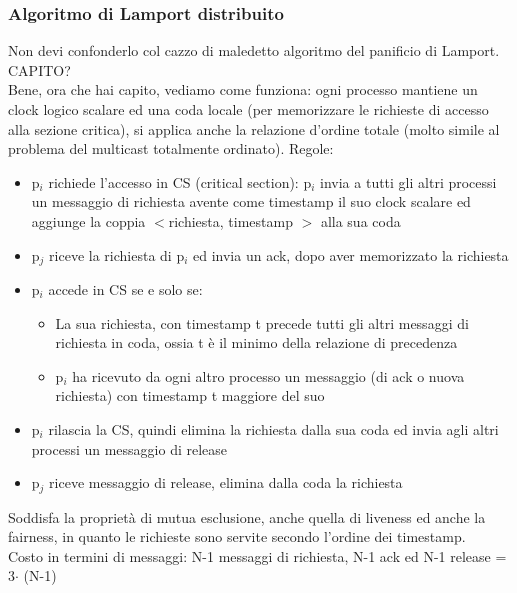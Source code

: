 \documentclass[16px]{article}
\begin{document}
\subsubsection{Algoritmo di Lamport distribuito}
Non devi confonderlo col cazzo di maledetto algoritmo del panificio di Lamport. CAPITO?\\ Bene, ora che hai capito, vediamo come funziona: ogni processo mantiene un clock logico scalare ed una coda locale (per memorizzare le richieste di accesso alla sezione critica), si applica anche la relazione d'ordine totale (molto simile al problema del multicast totalmente ordinato). Regole:
\begin{itemize}
\item p$_i$ richiede l'accesso in CS (critical section): p$_i$ invia a tutti gli altri processi un messaggio di richiesta avente come timestamp il suo clock scalare ed aggiunge la coppia $<$richiesta, timestamp $>$ alla sua coda
\item p$_j$ riceve la richiesta di p$_i$ ed invia un ack, dopo aver memorizzato la richiesta
\item p$_i$ accede in CS se e solo se:
\begin{itemize}
\item La sua richiesta, con timestamp t precede tutti gli altri messaggi di richiesta in coda, ossia t è il minimo della relazione di precedenza
\item p$_i$ ha ricevuto da ogni altro processo un messaggio (di ack o nuova richiesta) con timestamp t maggiore del suo
\end{itemize} 
\item p$_i$ rilascia la CS, quindi elimina la richiesta dalla sua coda ed invia agli altri processi un messaggio di release
\item p$_j$ riceve messaggio di release, elimina dalla coda la richiesta 
\end{itemize}
Soddisfa la proprietà di mutua esclusione, anche quella di liveness ed anche la fairness, in quanto le richieste sono servite secondo l'ordine dei timestamp.\\ Costo in termini di messaggi: N-1 messaggi di richiesta, N-1 ack ed N-1 release = 3$\cdot$ (N-1)
\end{document}
